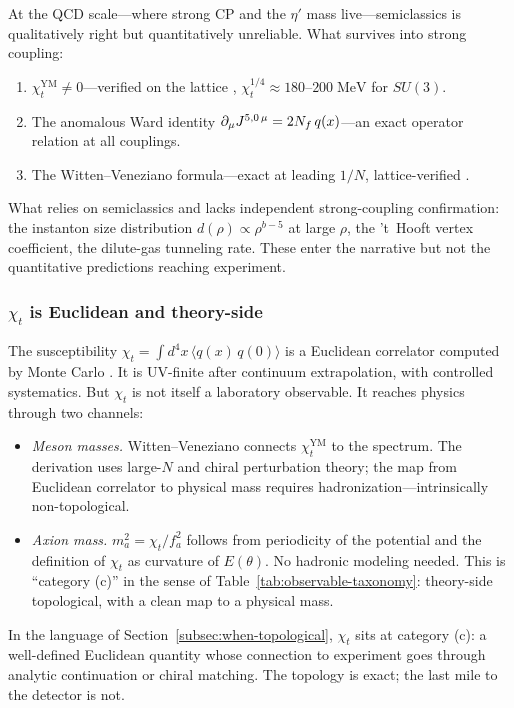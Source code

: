 At the QCD scale---where strong CP and the $\eta'$ mass live---semiclassics is qualitatively right but quantitatively unreliable.  What survives into strong coupling:
\begin{enumerate}
  \item $\chi_t^{\mathrm{YM}}\neq 0$---verified on the lattice \cite{Teper2000TopologyInQCD}, $\chi_t^{1/4}\approx 180$--$200\;\mathrm{MeV}$ for $SU(3)$.
  \item The anomalous Ward identity $\partial_\mu J^{5,0\,\mu} = 2N_f\,q(x)$---an exact operator relation at all couplings.
  \item The Witten--Veneziano formula---exact at leading $1/N$, lattice-verified \cite{CichyLatticeWittenVeneziano}.
\end{enumerate}
What relies on semiclassics and lacks independent strong-coupling confirmation: the instanton size distribution $d(\rho)\propto\rho^{b-5}$ at large $\rho$, the 't~Hooft vertex coefficient, the dilute-gas tunneling rate.  These enter the narrative but not the quantitative predictions reaching experiment.

\subsubsection{$\chi_t$ is Euclidean and theory-side}

The susceptibility $\chi_t = \int d^4x\,\langle q(x)\,q(0)\rangle$ is a Euclidean correlator computed by Monte Carlo \cite{Teper2000TopologyInQCD}.  It is UV-finite after continuum extrapolation, with controlled systematics.  But $\chi_t$ is not itself a laboratory observable.  It reaches physics through two channels:
\begin{itemize}
  \item \textit{Meson masses.} Witten--Veneziano connects $\chi_t^{\mathrm{YM}}$ to the spectrum.  The derivation uses large-$N$ and chiral perturbation theory; the map from Euclidean correlator to physical mass requires hadronization---intrinsically non-topological.
  \item \textit{Axion mass.} $m_a^2 = \chi_t/f_a^2$ follows from periodicity of the potential and the definition of $\chi_t$ as curvature of $E(\theta)$.  No hadronic modeling needed.  This is ``category (c)'' in the sense of Table~\ref{tab:observable-taxonomy}: theory-side topological, with a clean map to a physical mass.
\end{itemize}
In the language of Section~\ref{subsec:when-topological}, $\chi_t$ sits at category (c): a well-defined Euclidean quantity whose connection to experiment goes through analytic continuation or chiral matching.  The topology is exact; the last mile to the detector is not.

